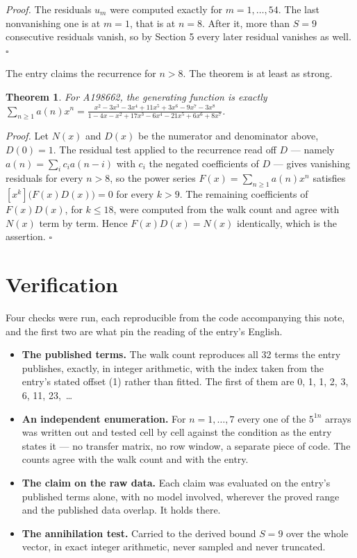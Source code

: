 \documentclass[11pt]{article}
\newtheorem{theorem}{Theorem}
\theoremstyle{definition}
\begin{document}
{\itshape Proof.} The residuals $u_m$ were computed exactly for $m = 1,\dots,54$. The last nonvanishing one is at $m = 1$, that is at $n = 8$. After it, more than $S = 9$ consecutive residuals vanish, so by Section 5 every later residual vanishes as well. $\square$

The entry claims the recurrence for $n > 8$. The theorem is at least as strong.

\begin{theorem} For A198662, the generating function is exactly $\sum_{n\ge 1} a(n)x^n = \frac{x^{2} - 3x^{3} - 3x^{4} + 11x^{5} + 3x^{6} - 9x^{7} - 3x^{8}}{1 - 4x - x^{2} + 17x^{3} - 6x^{4} - 21x^{5} + 6x^{6} + 8x^{7}}$.\end{theorem}

{\itshape Proof.} Let $N(x)$ and $D(x)$ be the numerator and denominator above, $D(0)=1$. The residual test applied to the recurrence read off $D$ --- namely $a(n) = \sum_i c_i a(n-i)$ with $c_i$ the negated coefficients of $D$ --- gives vanishing residuals for every $n > 8$, so the power series $F(x)=\sum_{n\ge 1}a(n)x^n$ satisfies $[x^k]\bigl(F(x)D(x)\bigr) = 0$ for every $k > 9$. The remaining coefficients of $F(x)D(x)$, for $k \le 18$, were computed from the walk count and agree with $N(x)$ term by term. Hence $F(x)D(x) = N(x)$ identically, which is the assertion. $\square$

\section{Verification}

Four checks were run, each reproducible from the code accompanying this note, and the first two are what pin the reading of the entry's English.

\begin{itemize}

\item {\bfseries The published terms.} The walk count reproduces all 32 terms the entry publishes, exactly, in integer arithmetic, with the index taken from the entry's stated offset (1) rather than fitted. The first of them are 0, 1, 1, 2, 3, 6, 11, 23,~\dots

\item {\bfseries An independent enumeration.} For $n = 1,\dots,7$ every one of the $5^{1n}$ arrays was written out and tested cell by cell against the condition as the entry states it --- no transfer matrix, no row window, a separate piece of code. The counts agree with the walk count and with the entry.

\item {\bfseries The claim on the raw data.} Each claim was evaluated on the entry's published terms alone, with no model involved, wherever the proved range and the published data overlap. It holds there.

\item {\bfseries The annihilation test.} Carried to the derived bound $S = 9$ over the whole vector, in exact integer arithmetic, never sampled and never truncated.

\end{itemize}
\end{document}

